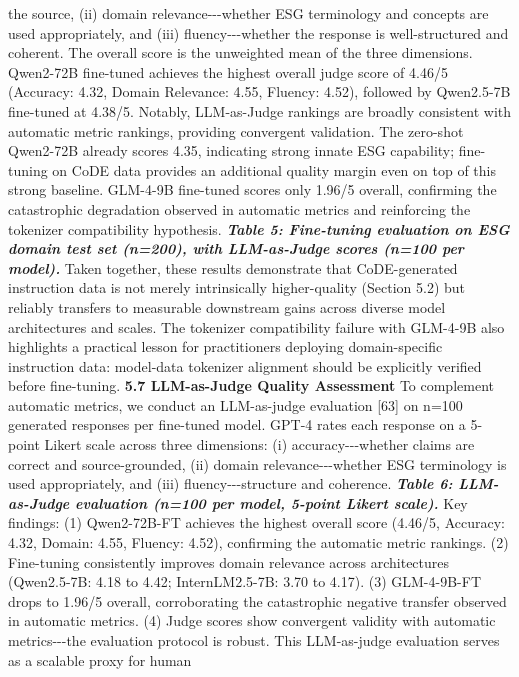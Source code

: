 \documentclass[9pt,twocolumn]{extarticle}
\begin{document}
the source, (ii) domain relevance-\/-\/-whether ESG terminology and
concepts are used appropriately, and (iii) fluency-\/-\/-whether the
response is well-structured and coherent. The overall score is the
unweighted mean of the three dimensions.
Qwen2-72B fine-tuned achieves the highest overall judge score of 4.46/5
(Accuracy: 4.32, Domain Relevance: 4.55, Fluency: 4.52), followed by
Qwen2.5-7B fine-tuned at 4.38/5. Notably, LLM-as-Judge rankings are
broadly consistent with automatic metric rankings, providing convergent
validation. The zero-shot Qwen2-72B already scores 4.35, indicating
strong innate ESG capability; fine-tuning on CoDE data provides an
additional quality margin even on top of this strong baseline. GLM-4-9B
fine-tuned scores only 1.96/5 overall, confirming the catastrophic
degradation observed in automatic metrics and reinforcing the tokenizer
compatibility hypothesis.
\emph{\textbf{Table 5: Fine-tuning evaluation on ESG domain test set
(n=200), with LLM-as-Judge scores (n=100 per model).}}
Taken together, these results demonstrate that CoDE-generated
instruction data is not merely intrinsically higher-quality (Section
5.2) but reliably transfers to measurable downstream gains across
diverse model architectures and scales. The tokenizer compatibility
failure with GLM-4-9B also highlights a practical lesson for
practitioners deploying domain-specific instruction data: model-data
tokenizer alignment should be explicitly verified before fine-tuning.
\textbf{5.7 LLM-as-Judge Quality Assessment}
To complement automatic metrics, we conduct an LLM-as-judge evaluation
[63] on n=100 generated responses per fine-tuned model. GPT-4 rates
each response on a 5-point Likert scale across three dimensions: (i)
accuracy-\/-\/-whether claims are correct and source-grounded, (ii)
domain relevance-\/-\/-whether ESG terminology is used appropriately,
and (iii) fluency-\/-\/-structure and coherence.
\emph{\textbf{Table 6: LLM-as-Judge evaluation (n=100 per model, 5-point
Likert scale).}}
Key findings: (1) Qwen2-72B-FT achieves the highest overall score
(4.46/5, Accuracy: 4.32, Domain: 4.55, Fluency: 4.52), confirming the
automatic metric rankings. (2) Fine-tuning consistently improves domain
relevance across architectures (Qwen2.5-7B: 4.18 to 4.42;
InternLM2.5-7B: 3.70 to 4.17). (3) GLM-4-9B-FT drops to 1.96/5 overall,
corroborating the catastrophic negative transfer observed in automatic
metrics. (4) Judge scores show convergent validity with automatic
metrics-\/-\/-the evaluation protocol is robust.
This LLM-as-judge evaluation serves as a scalable proxy for human
\end{document}
